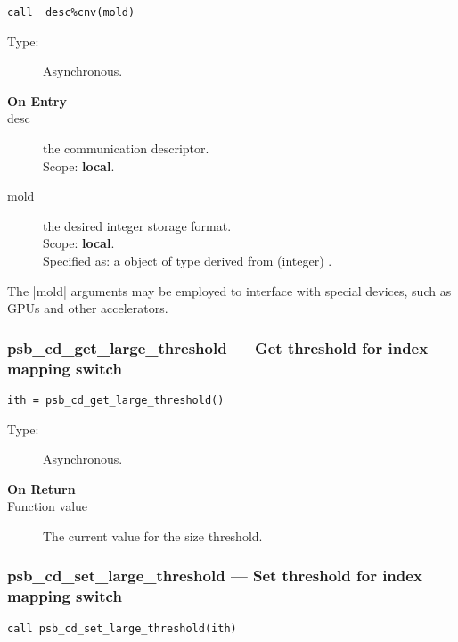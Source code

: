 \begin{verbatim}
call  desc%cnv(mold)
\end{verbatim}

\begin{description}
\item[Type:] Asynchronous.
\item[\bf On Entry]
\item[desc] the communication descriptor.\\
Scope: {\bf local}.\\
\item[mold] the desired integer storage format.\\
Scope: {\bf local}.\\
Specified as: a object of type derived from (integer) \vbasedata.
\end{description}
The \fortinline|mold|  arguments may be
employed to interface with special devices, such as GPUs and other
accelerators. 



\subsubsection{psb\_cd\_get\_large\_threshold --- Get threshold for
  index mapping switch}

\begin{verbatim}
ith = psb_cd_get_large_threshold()
\end{verbatim}

\begin{description}
\item[Type:] Asynchronous.
\item[\bf On Return]
\item[Function value] The current value for the size threshold. 

\end{description}



\subsubsection{psb\_cd\_set\_large\_threshold --- Set threshold for
  index mapping switch}

\begin{verbatim}
call psb_cd_set_large_threshold(ith)
\end{verbatim}

